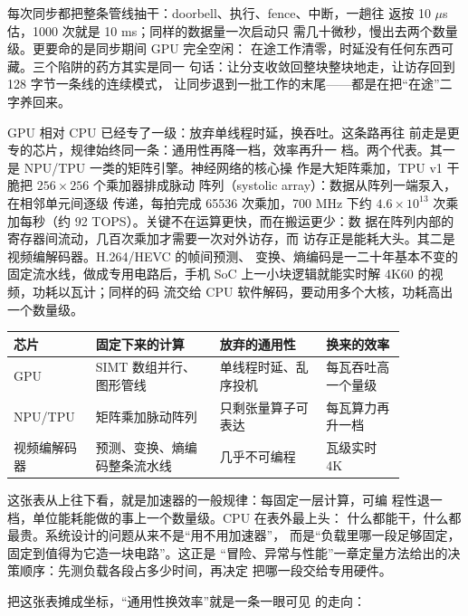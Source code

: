 每次同步都把整条管线抽干：doorbell、执行、fence、中断，一趟往
返按 10 $\mu$s 估，1000 次就是 10 ms；同样的数据量一次启动只
需几十微秒，慢出去两个数量级。更要命的是同步期间 GPU 完全空闲：
在途工作清零，时延没有任何东西可藏。三个陷阱的药方其实是同一
句话：让分支收敛回整块整块地走，让访存回到 128 字节一条线的连续模式，
让同步退到一批工作的末尾——都是在把“在途”二字养回来。

GPU 相对 CPU 已经专了一级：放弃单线程时延，换吞吐。这条路再往
前走是更专的芯片，规律始终同一条：通用性再降一档，效率再升一
档。两个代表。其一是 NPU/TPU 一类的矩阵引擎。神经网络的核心操
作是大矩阵乘加，TPU v1 干脆把 $256\times256$ 个乘加器排成脉动
阵列（systolic array）：数据从阵列一端泵入，在相邻单元间逐级
传递，每拍完成 65536 次乘加，700 MHz 下约 $4.6\times10^{13}$
次乘加每秒（约 92 TOPS）。关键不在运算更快，而在搬运更少：数
据在阵列内部的寄存器间流动，几百次乘加才需要一次对外访存，而
访存正是能耗大头。其二是视频编解码器。H.264/HEVC 的帧间预测、
变换、熵编码是一二十年基本不变的固定流水线，做成专用电路后，手机
SoC 上一小块逻辑就能实时解 4K60 的视频，功耗以瓦计；同样的码
流交给 CPU 软件解码，要动用多个大核，功耗高出一个数量级。

\begin{longtable}{L{0.16\linewidth}L{0.28\linewidth}L{0.24\linewidth}L{0.18\linewidth}}
\toprule
芯片 & 固定下来的计算 & 放弃的通用性 & 换来的效率 \\
\midrule
GPU & SIMT 数组并行、图形管线 & 单线程时延、乱序投机 & 每瓦吞吐高一个量级 \\\tablerowrule
NPU/TPU & 矩阵乘加脉动阵列 & 只剩张量算子可表达 & 每瓦算力再升一档 \\\tablerowrule
视频编解码器 & 预测、变换、熵编码整条流水线 & 几乎不可编程 & 瓦级实时 4K \\
\bottomrule
\end{longtable}

这张表从上往下看，就是加速器的一般规律：每固定一层计算，可编
程性退一档，单位能耗能做的事上一个数量级。CPU 在表外最上头：
什么都能干，什么都最贵。系统设计的问题从来不是“用不用加速器”，
而是“负载里哪一段足够固定，固定到值得为它造一块电路”。这正是
“冒险、异常与性能”一章定量方法给出的决策顺序：先测负载各段占多少时间，再决定
把哪一段交给专用硬件。

把这张表摊成坐标，“通用性换效率”就是一条一眼可见
的走向：


